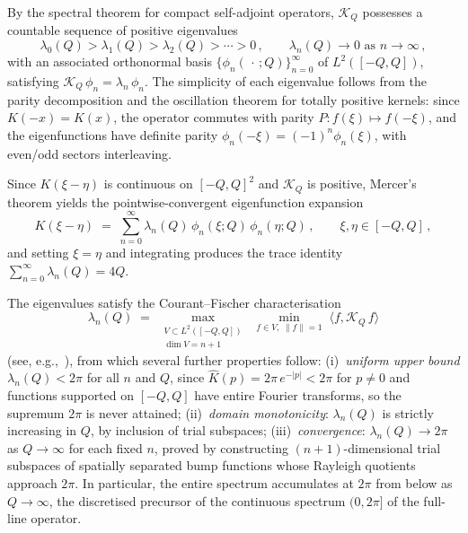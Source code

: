 \documentclass[11pt,a4paper]{article}
\theoremstyle{definition}
\begin{document}
By the spectral theorem for compact self-adjoint operators, $\mathcal{K}_Q$
possesses a countable sequence of positive eigenvalues
\begin{equation}\label{eq.eig-ordering}
  \lambda_0(Q) > \lambda_1(Q) > \lambda_2(Q) > \cdots > 0\,,
  \qquad
  \lambda_n(Q) \to 0 \text{ as } n \to \infty\,,
\end{equation}
with an associated orthonormal basis $\{\phi_n(\,\cdot\,; Q)\}_{n=0}^{\infty}$
of $L^2([-Q,Q])$, satisfying $\mathcal{K}_Q\, \phi_n = \lambda_n\, \phi_n$.
The simplicity of each eigenvalue follows from the parity decomposition and the oscillation theorem for totally positive kernels: since $K(-x) = K(x)$, the operator commutes with parity $P: f(\xi) \mapsto f(-\xi)$, and the eigenfunctions have definite parity $\phi_n(-\xi) = (-1)^n \phi_n(\xi)$, with even/odd sectors interleaving.

Since $K(\xi-\eta)$ is continuous on $[-Q,Q]^2$ and $\mathcal{K}_Q$ is positive, Mercer's theorem yields the pointwise-convergent eigenfunction expansion
\begin{equation}\label{eq.mercer}
  K(\xi-\eta)
  \;=\;
  \sum_{n=0}^{\infty} \lambda_n(Q)\,
    \phi_n(\xi;Q)\, \phi_n(\eta;Q)\,,
  \qquad
  \xi,\eta \in [-Q,Q]\,,
\end{equation}
and setting $\xi = \eta$ and integrating produces the trace identity $\sum_{n=0}^{\infty}\lambda_n(Q) = 4Q$.

The eigenvalues satisfy the Courant--Fischer characterisation
\begin{equation}\label{eq.minmax}
    \lambda_n(Q)
    \;=\;
    \max_{\substack{V \subset L^2([-Q,Q]) \\[1pt] \dim V = n+1}}
    \;\min_{f \in V,\; \|f\|=1}
    \;\langle f, \mathcal{K}_Q\, f \rangle
\end{equation}
(see, e.g.,~\cite{RS4}), from which several further properties follow: (i)~\emph{uniform upper bound} $\lambda_n(Q) < 2\pi$ for all $n$ and $Q$, since $\hat K(p) = 2\pi\,e^{-|p|} < 2\pi$ for $p \neq 0$ and functions supported on $[-Q,Q]$ have entire Fourier transforms, so the supremum $2\pi$ is never attained; (ii)~\emph{domain monotonicity}: $\lambda_n(Q)$ is strictly increasing in $Q$, by inclusion of trial subspaces; (iii)~\emph{convergence}: $\lambda_n(Q) \to 2\pi$ as $Q \to \infty$ for each fixed $n$, proved by constructing $(n+1)$-dimensional trial subspaces of spatially separated bump functions whose Rayleigh quotients approach $2\pi$. In particular, the entire spectrum accumulates at $2\pi$ from below as $Q \to \infty$, the discretised precursor of the continuous spectrum $(0, 2\pi]$ of the full-line operator.
\end{document}
